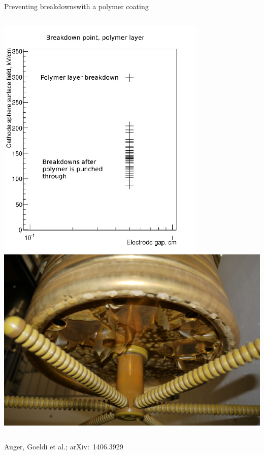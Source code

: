 \documentclass[]{beamer}
\begin{document}
\begin{frame}{Preventing breakdowns}{with a polymer coating}
\begin{columns}[c]
		\includegraphics[width=\textwidth]{defence/breakdown_latex}
		\centering
		\includegraphics[height=.95\textwidth, angle=90]{defence/AT_cathode}
	\end{columns}
	\centering
	{\tiny Auger, Goeldi et al.; arXiv:~1406.3929~\cite{latex}}\\
\end{frame}
\end{document}
